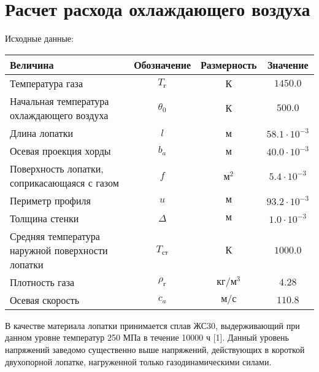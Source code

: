 \section{Расчет расхода охлаждающего воздуха}

Исходные данные:
\begin{center}
	\begin{tabular}{|p{7cm}|c|c|c|}
		\hline
		\textbf{Величина} & \textbf{Обозначение} & \textbf{Размерность} & \textbf{Значение} \\ \hline
		Температура газа & $T_г$ & К & $1450.0$ \\ \hline
		Начальная температура охлаждающего воздуха & $\theta_0$ & К & $500.0$ \\ \hline
		Длина лопатки & $l$ & м & $58.1 \cdot 10^{-3}$ \\ \hline
		Осевая проекция хорды & $b_a$ & м & $40.0 \cdot 10^{-3}$ \\ \hline
		Поверхность лопатки, соприкасающаяся с газом & $f$ & $м^2$ & $5.4 \cdot 10^{-3}$ \\ \hline
		Периметр профиля & $u$ & $м$ & $93.2 \cdot 10^{-3}$ \\ \hline
		Толщина стенки & $\Delta$ & $м$ & $1.0 \cdot 10^{-3}$ \\ \hline
		Средняя температура наружной поверхности лопатки & $T_{ст}$ & $К$ & $1000.0$ \\ \hline
		Плотность газа & $\rho_г$ & $кг/м^3$ & $4.28$ \\ \hline
		Осевая скорость & $c_a$ & $м/с$ & $110.8$ \\ \hline
	\end{tabular}
\end{center}

В качестве материала лопатки принимается сплав ЖС30, выдерживающий при данном уровне температур 250 МПа в течение 10000 ч [1].
Данный уровень напряжений заведомо существенно выше напряжений, действующих в короткой двухопорной лопатке, нагруженной
только газодинамическими силами.

